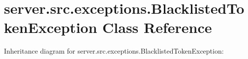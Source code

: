 \hypertarget{classserver_1_1src_1_1exceptions_1_1_blacklisted_token_exception}{}\section{server.\+src.\+exceptions.\+Blacklisted\+Token\+Exception Class Reference}
\label{classserver_1_1src_1_1exceptions_1_1_blacklisted_token_exception}


Inheritance diagram for server.\+src.\+exceptions.\+Blacklisted\+Token\+Exception\+:
